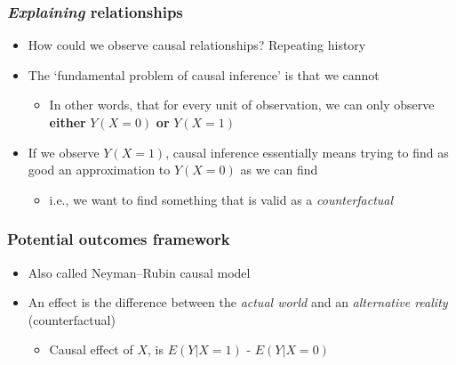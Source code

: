 \documentclass[aspectratio=43]{beamer}
\begin{document}
\begin{frame}
\frametitle{\textit{Explaining} relationships}
\centering

\begin{itemize}[<+->]
  \item How could we observe causal relationships? Repeating history
  \item The `fundamental problem of causal inference' is that we cannot
  \begin{itemize}
    \item In other words, that for every unit of observation, we can only observe \textbf{either} $Y(X=0)$ \textbf{or} $Y(X=1)$
  \end{itemize}
  \item If we observe $Y(X=1)$, causal inference essentially means trying to find as good an approximation to $Y(X=0)$ as we can find
  \begin{itemize}
    \item i.e., we want to find something that is valid as a \textit{counterfactual}
  \end{itemize}
\end{itemize}

\end{frame}

\begin{frame}
\frametitle{Potential outcomes framework}
\centering

\begin{itemize}[<+->]
  \item Also called Neyman–Rubin causal model
  \item An effect is the difference between the \textit{actual world} and an \textit{alternative reality} (counterfactual)
  \begin{itemize}
    \item Causal effect of $X$, is $E(Y|X = 1)$ - $E(Y|X = 0)$
  \end{itemize}
\end{itemize}

\end{frame}
\end{document}
